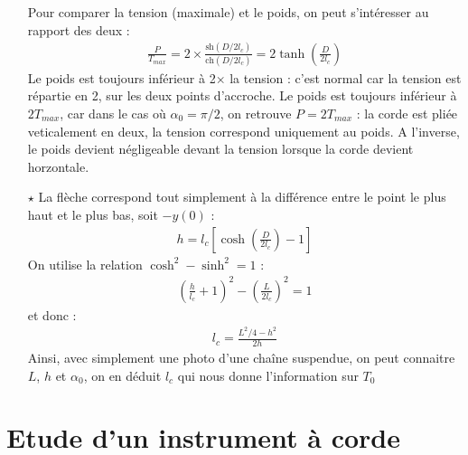 \documentclass{report}
\begin{document}
\begin{itemize}
Pour comparer la tension (maximale) et le poids, on peut s'intéresser au rapport des deux : 
\begin{align*}
	\frac{P}{T_{max}}=2\times\frac{\mathrm{sh}(D/2l_c)}{\mathrm{ch}(D/2l_c)}=2\tanh\left(\frac{D}{2l_c} \right) 
\end{align*}
Le poids est toujours inférieur à 2$\times$ la tension : c'est normal car la tension est répartie en 2, sur les deux points d'accroche. Le poids est toujours inférieur à $2T_{max}$, car dans le cas où $\alpha_0=\pi/2$, on retrouve $P=2T_{max}$ : la corde est pliée veticalement en deux, la tension correspond uniquement au poids. A l'inverse, le poids devient négligeable devant la tension lorsque la corde devient horzontale.

	\item[$\star$] 	La flèche correspond tout simplement à la différence entre le point le plus haut et le plus bas, soit $-y(0)$ :
	\begin{align*}
		h=l_c\left[\cosh\left(\frac{D}{2l_c} \right) -1 \right] 
	\end{align*}
	On utilise la relation $\cosh^2-\sinh^2=1$ :
	\begin{align*}
		\left( \frac{h}{l_c}+1\right) ^2-\left( \frac{L}{2l_c}\right) ^2=1
	\end{align*}
	et donc :
	\begin{align*}
		l_c=\frac{L^2/4-h^2}{2h}
	\end{align*}
	Ainsi, avec simplement une photo d'une chaîne suspendue, on peut connaitre $L$, $h$ et $\alpha_0$, on en déduit $l_c$ qui nous donne l'information sur $T_0$
	
\end{itemize}

\section*{Etude d'un instrument à corde}
\end{document}
